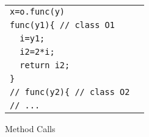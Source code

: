 %
%
%

 

\begin{figure}
\centering
\begin{tabular}{ll}
{\tt  x=o.func(y) } &  \\ 
 {\tt  func(y1)\{ // class O1} &  \\
 {\tt  \ \      i=y1; } & \\
 {\tt  \ \      i2=2*i; } &  \\
 {\tt  \  \      return i2;} & \\ 
 {\tt           \}} & \\ 
  {\tt //  func(y2)\{ // class O2} &  \\
   {\tt //    ...     } & \\ 
  
  
\end{tabular}
\caption{Method Calls}
\label{fig:methcall}
\end{figure}






